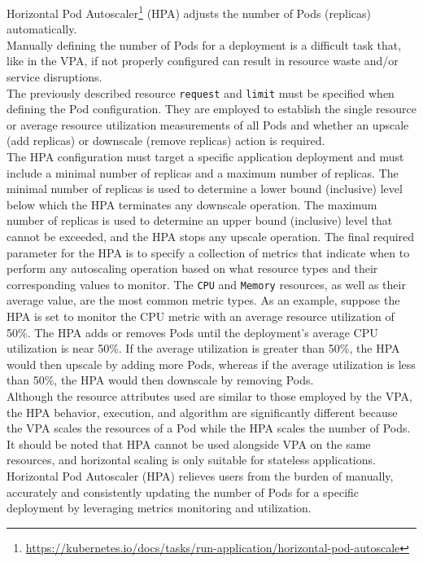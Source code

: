Horizontal Pod Autoscaler\footnote{\url{https://kubernetes.io/docs/tasks/run-application/horizontal-pod-autoscale}}
(HPA) adjusts the number of Pods (replicas) automatically. \\ %

Manually defining the number of Pods for a deployment is a difficult task that, like
in the VPA, if not properly configured can result in resource waste and/or
service disruptions. \\ %
The previously described resource \texttt{request} and \texttt{limit} must be
specified when defining the Pod configuration. They are employed to establish the
single resource or average resource utilization measurements of all Pods and whether
an upscale (add replicas) or downscale (remove replicas) action is required. \\ %
The HPA configuration must target a specific application deployment and must include
a minimal number of replicas and a maximum number of replicas. The minimal
number of replicas is used to determine a lower bound (inclusive) level below
which the HPA terminates any downscale operation. The maximum number of replicas
is used to determine an upper bound (inclusive) level that cannot be exceeded,
and the HPA stops any upscale operation. The final required parameter for the HPA
is to specify a collection of metrics that indicate when to perform any autoscaling
operation based on what resource types and their corresponding values to monitor.
The \texttt{CPU} and \texttt{Memory} resources, as well as their average value,
are the most common metric types. As an example, suppose the HPA is set to
monitor the CPU metric with an average resource utilization of 50\%. The HPA
adds or removes Pods until the deployment's average CPU utilization is near 50\%.
If the average utilization is greater than 50\%, the HPA would then upscale by
adding more Pods, whereas if the average utilization is less than 50\%, the HPA would
then downscale by removing Pods. \\ %
Although the resource attributes used are similar to those employed by the VPA,
the HPA behavior, execution, and algorithm are significantly different because
the VPA scales the resources of a Pod while the HPA scales the number of Pods. It
should be noted that HPA cannot be used alongside VPA on the same resources, and
horizontal scaling is only suitable for stateless applications. \\ %
Horizontal Pod Autoscaler (HPA) relieves users from the burden of manually, accurately
and consistently updating the number of Pods for a specific deployment by leveraging
metrics monitoring and utilization.

